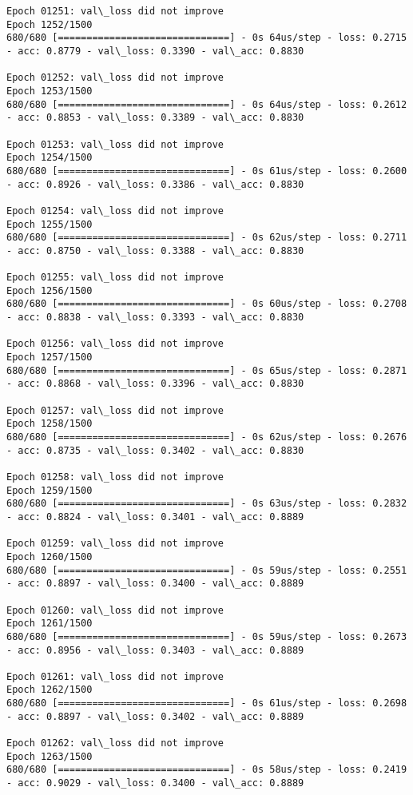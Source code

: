 \documentclass[11pt]{article}
\begin{document}
\begin{Verbatim}[commandchars=\\\{\}]
Epoch 01251: val\_loss did not improve
Epoch 1252/1500
680/680 [==============================] - 0s 64us/step - loss: 0.2715 - acc: 0.8779 - val\_loss: 0.3390 - val\_acc: 0.8830

Epoch 01252: val\_loss did not improve
Epoch 1253/1500
680/680 [==============================] - 0s 64us/step - loss: 0.2612 - acc: 0.8853 - val\_loss: 0.3389 - val\_acc: 0.8830

Epoch 01253: val\_loss did not improve
Epoch 1254/1500
680/680 [==============================] - 0s 61us/step - loss: 0.2600 - acc: 0.8926 - val\_loss: 0.3386 - val\_acc: 0.8830

Epoch 01254: val\_loss did not improve
Epoch 1255/1500
680/680 [==============================] - 0s 62us/step - loss: 0.2711 - acc: 0.8750 - val\_loss: 0.3388 - val\_acc: 0.8830

Epoch 01255: val\_loss did not improve
Epoch 1256/1500
680/680 [==============================] - 0s 60us/step - loss: 0.2708 - acc: 0.8838 - val\_loss: 0.3393 - val\_acc: 0.8830

Epoch 01256: val\_loss did not improve
Epoch 1257/1500
680/680 [==============================] - 0s 65us/step - loss: 0.2871 - acc: 0.8868 - val\_loss: 0.3396 - val\_acc: 0.8830

Epoch 01257: val\_loss did not improve
Epoch 1258/1500
680/680 [==============================] - 0s 62us/step - loss: 0.2676 - acc: 0.8735 - val\_loss: 0.3402 - val\_acc: 0.8830

Epoch 01258: val\_loss did not improve
Epoch 1259/1500
680/680 [==============================] - 0s 63us/step - loss: 0.2832 - acc: 0.8824 - val\_loss: 0.3401 - val\_acc: 0.8889

Epoch 01259: val\_loss did not improve
Epoch 1260/1500
680/680 [==============================] - 0s 59us/step - loss: 0.2551 - acc: 0.8897 - val\_loss: 0.3400 - val\_acc: 0.8889

Epoch 01260: val\_loss did not improve
Epoch 1261/1500
680/680 [==============================] - 0s 59us/step - loss: 0.2673 - acc: 0.8956 - val\_loss: 0.3403 - val\_acc: 0.8889

Epoch 01261: val\_loss did not improve
Epoch 1262/1500
680/680 [==============================] - 0s 61us/step - loss: 0.2698 - acc: 0.8897 - val\_loss: 0.3402 - val\_acc: 0.8889

Epoch 01262: val\_loss did not improve
Epoch 1263/1500
680/680 [==============================] - 0s 58us/step - loss: 0.2419 - acc: 0.9029 - val\_loss: 0.3400 - val\_acc: 0.8889


\end{Verbatim}
\end{document}
